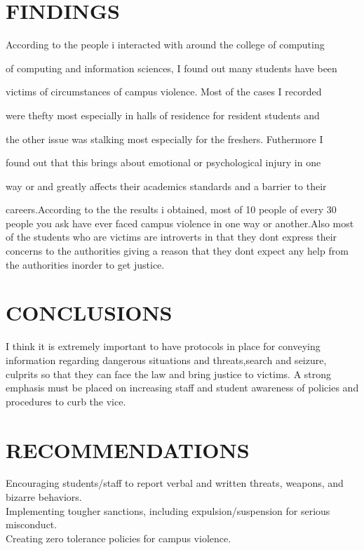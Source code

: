 \documentclass[10pt]{report}
\begin{document}
\section{FINDINGS}
{   According to the people i interacted with around the college of computing 

	of computing and information sciences, I found out many students have been 

	victims of circumstances of campus violence. Most of the cases I recorded 

	were thefty most especially in halls of residence for resident students and 

	the other issue was stalking most especially for the freshers. Futhermore I 

	found out that this brings about emotional or psychological injury in one 

	way or and greatly affects their academics standards and a barrier to their 

	careers.According to the the results i obtained, most of 10 people of every 30 people you ask have ever faced campus violence in one 
	way or another.Also most of the students who are victims are introverts in that they dont express their concerns to the authorities
	giving a reason that they dont expect any help from the authorities inorder to get justice.

}


	
\section{CONCLUSIONS}
{I think it is extremely important to have protocols in place for conveying information regarding dangerous situations and threats,search and seizure, culprits so that they can face the law and bring justice to victims. A strong emphasis must be placed on increasing staff and student awareness of policies and procedures to curb the vice.
}
\section{RECOMMENDATIONS}
{Encouraging students/staff to report verbal and written threats, weapons, and bizarre behaviors.\\
	Implementing tougher sanctions, including expulsion/suspension for serious misconduct.\\
	Creating zero tolerance policies for campus violence.
}
\end{document}
